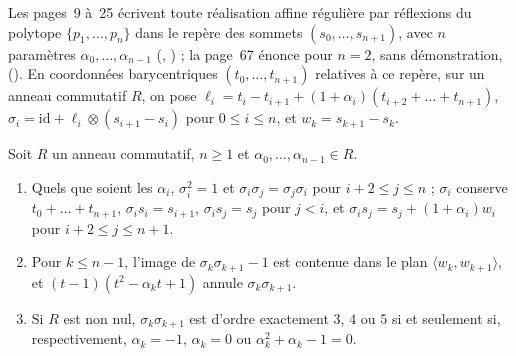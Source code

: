 Les pages~9 à~25 écrivent toute réalisation affine régulière par réflexions du polytope $\{p_1, \dots, p_n\}$ dans le repère des sommets $(s_0, \dots, s_{n+1})$, avec $n$ paramètres $\alpha_0, \dots, \alpha_{n-1}$ (, ) ; la page~67 énonce pour $n = 2$, sans démonstration,  (). En coordonnées barycentriques $(t_0, \dots, t_{n+1})$ relatives à ce repère, sur un anneau commutatif $R$, on pose $\ell_i = t_i - t_{i+1} + (1 + \alpha_i)(t_{i+2} + \dots + t_{n+1})$, $\sigma_i = \mathrm{id} + \ell_i \otimes (s_{i+1} - s_i)$ pour $0 \leq i \leq n$, et $w_k = s_{k+1} - s_k$.

\begin{encadre}
\begin{theoreme}
Soit $R$ un anneau commutatif, $n \geq 1$ et $\alpha_0, \dots, \alpha_{n-1} \in R$.
\begin{enumerate}
\item Quels que soient les $\alpha_i$, $\sigma_i^2 = 1$ et $\sigma_i\sigma_j = \sigma_j\sigma_i$ pour $i + 2 \leq j \leq n$ ; $\sigma_i$ conserve $t_0 + \dots + t_{n+1}$, $\sigma_i s_i = s_{i+1}$, $\sigma_i s_j = s_j$ pour $j < i$, et $\sigma_i s_j = s_j + (1 + \alpha_i) w_i$ pour $i + 2 \leq j \leq n + 1$.
\item Pour $k \leq n - 1$, l'image de $\sigma_k\sigma_{k+1} - 1$ est contenue dans le plan $\langle w_k, w_{k+1}\rangle$, et $(t - 1)(t^2 - \alpha_k t + 1)$ annule $\sigma_k\sigma_{k+1}$.
\item Si $R$ est non nul, $\sigma_k\sigma_{k+1}$ est d'ordre exactement $3$, $4$ ou $5$ si et seulement si, respectivement, $\alpha_k = -1$, $\alpha_k = 0$ ou $\alpha_k^2 + \alpha_k - 1 = 0$.
\end{enumerate}
\end{theoreme}
\end{encadre}

